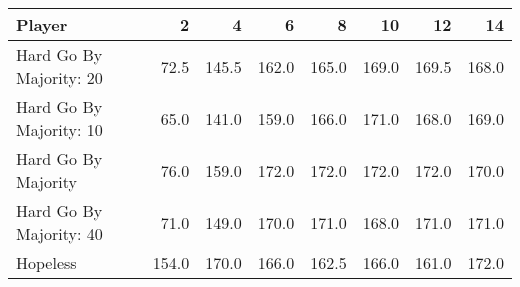 \begin{tabular}{lrrrrrrr}
\toprule
                  Player &      2 &      4 &      6 &      8 &     10 &     12 &     14 \\
\midrule
 Hard Go By Majority: 20 &   72.5 &  145.5 &  162.0 &  165.0 &  169.0 &  169.5 &  168.0 \\
 Hard Go By Majority: 10 &   65.0 &  141.0 &  159.0 &  166.0 &  171.0 &  168.0 &  169.0 \\
     Hard Go By Majority &   76.0 &  159.0 &  172.0 &  172.0 &  172.0 &  172.0 &  170.0 \\
 Hard Go By Majority: 40 &   71.0 &  149.0 &  170.0 &  171.0 &  168.0 &  171.0 &  171.0 \\
                Hopeless &  154.0 &  170.0 &  166.0 &  162.5 &  166.0 &  161.0 &  172.0 \\
\bottomrule
\end{tabular}
